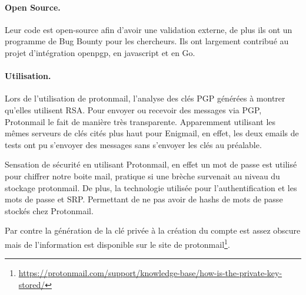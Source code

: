 \paragraph*{Open Source.}
Leur code est open-source afin d'avoir une validation externe, de plus ils ont un programme de Bug Bounty pour les chercheurs. Ils ont largement contribué au projet d'intégration openpgp, en javascript et en Go.

\paragraph*{Utilisation.}
Lors de l'utilisation de protonmail, l'analyse des clés PGP générées à montrer qu'elles utilisent RSA. Pour envoyer ou recevoir des messages via PGP, Protonmail le fait de manière très transparente. Apparemment utilisant les mêmes serveurs de clés cités plus haut pour Enigmail, en effet, les deux emails de tests ont pu s'envoyer des messages sans s'envoyer les clés au préalable.

Sensation de sécurité en utilisant Protonmail, en effet un mot de passe est utilisé pour chiffrer notre boite mail, pratique si une brèche survenait au niveau du stockage protonmail. De plus, la technologie utilisée pour l'authentification et les mots de passe et SRP. Permettant de ne pas avoir de hashs de mots de passe stockés chez Protonmail.

Par contre la génération de la clé privée à la création du compte est assez obscure mais de l'information est disponible sur le site de protonmail\footnote{\url{https://protonmail.com/support/knowledge-base/how-is-the-private-key-stored/}}.


